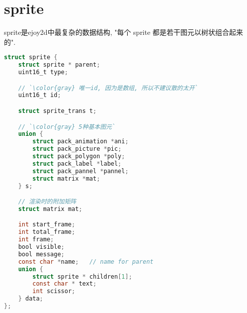 \section {\ZHH sprite} {

    { sprite是ejoy2d中最复杂的数据结构, "每个 sprite 都是若干图元以树状组合起来的".}\par

\begin{lstlisting}[language=C]
struct sprite {
    struct sprite * parent;
    uint16_t type;

    // `\color{gray} 唯一id, 因为是数组, 所以不建议散的太开`
    uint16_t id;

    struct sprite_trans t;

    // `\color{gray} 5种基本图元`
    union {
        struct pack_animation *ani;
        struct pack_picture *pic;
        struct pack_polygon *poly;
        struct pack_label *label;
        struct pack_pannel *pannel;
        struct matrix *mat;
    } s;

    // 渲染时的附加矩阵
    struct matrix mat;

    int start_frame;
    int total_frame;
    int frame;
    bool visible;
    bool message;
    const char *name;	// name for parent
    union {
        struct sprite * children[1];
        const char * text;
        int scissor;
    } data;
};
\end{lstlisting}

}



